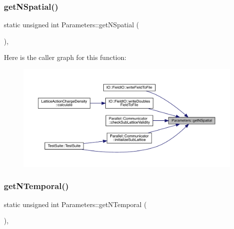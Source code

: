 \subsubsection{\texorpdfstring{getNSpatial()}{getNSpatial()}}
{\footnotesize\ttfamily static unsigned int Parameters\+::get\+N\+Spatial (\begin{DoxyParamCaption}{ }\end{DoxyParamCaption})\hspace{0.3cm}{\ttfamily [inline]}, {\ttfamily [static]}}

Here is the caller graph for this function\+:
\nopagebreak
\begin{figure}[H]
\begin{center}
\leavevmode
\includegraphics[width=350pt]{class_parameters_a52b90e94a378ec9fe8c504cf546e98fa_icgraph}
\end{center}
\end{figure}
\mbox{\label{class_parameters_a237ea1286459e8c648e983464829fe8d}} 
\subsubsection{\texorpdfstring{getNTemporal()}{getNTemporal()}}
{\footnotesize\ttfamily static unsigned int Parameters\+::get\+N\+Temporal (\begin{DoxyParamCaption}{ }\end{DoxyParamCaption})\hspace{0.3cm}{\ttfamily [inline]}, {\ttfamily [static]}}

